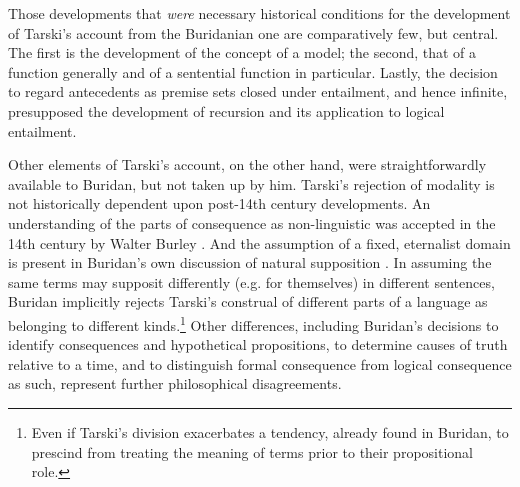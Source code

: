 \documentclass[]{article}
\begin{document}






Those developments that \textit{were} necessary historical conditions for the development of Tarski's account from the Buridanian one are comparatively few, but central. The first is the development of the concept of a model; the second, that of a function generally and of a sentential function in particular. Lastly, the decision to regard antecedents as premise sets closed under entailment, and hence infinite, presupposed the development of recursion and its application to logical entailment.


Other elements of Tarski's account, on the other hand, were straightforwardly available to Buridan, but not taken up by him. Tarski's rejection of modality is not historically dependent upon post-14th century developments. An understanding of the parts of consequence as non-linguistic was accepted in the 14th century by Walter Burley \autocite{Bulthuis2016}. And the assumption of a fixed, eternalist domain is present in Buridan's own discussion of natural supposition \autocite[4.3.4]{BuridanKlimaSD}. In assuming the same terms may supposit differently (e.g. for themselves) in different sentences, Buridan implicitly rejects Tarski's construal of different parts of a language as belonging to different kinds.\footnote{Even if Tarski's division exacerbates a tendency, already found in Buridan, to prescind from treating the meaning of terms prior to their propositional role.} Other differences, including Buridan's decisions to identify consequences and hypothetical propositions, to determine causes of truth relative to a time, and to distinguish formal consequence from logical consequence as such, represent further philosophical disagreements.
\end{document}
